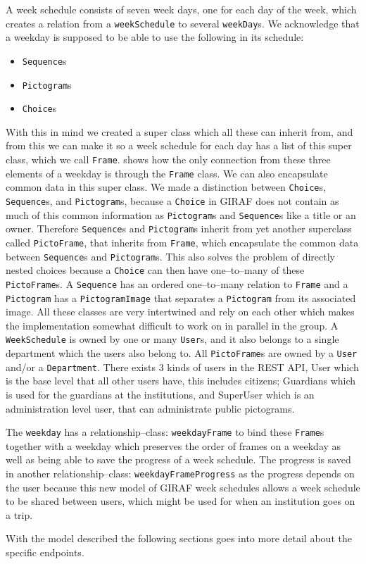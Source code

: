 A week schedule consists of seven week days, one for each day of the week, which creates a relation from a \texttt{weekSchedule} to several \texttt{weekDay}s.
We acknowledge that a weekday is supposed to be able to use the following in its schedule: 
\begin{multicols}{3}
\begin{itemize}
	\item \texttt{Sequence}s
	\item \texttt{Pictogram}s
	\item \texttt{Choice}s
\end{itemize}     
\end{multicols}

With this in mind we created a super class which all these can inherit from, and from this we can make it so a week schedule for each day has a list of this super class, which we call \texttt{Frame}.
 shows how the only connection from these three elements of a weekday is through the \texttt{Frame} class.
We can also encapsulate common data in this super class.
We made a distinction between \texttt{Choice}s, \texttt{Sequence}s, and \texttt{Pictogram}s, because a \texttt{Choice} in GIRAF does not contain as much of this common information as \texttt{Pictogram}s and \texttt{Sequence}s like a title or an owner.
Therefore \texttt{Sequence}s and \texttt{Pictogram}s inherit from yet another superclass called \texttt{PictoFrame}, that inherits from \texttt{Frame}, which encapsulate the common data between \texttt{Sequence}s and \texttt{Pictogram}s.
This also solves the problem of directly nested choices because a \texttt{Choice} can then have one--to--many of these \texttt{PictoFrame}s.
A \texttt{Sequence} has an ordered one--to--many relation to \texttt{Frame} and a \texttt{Pictogram} has a \texttt{PictogramImage} that separates a \texttt{Pictogram} from its associated image.
All these classes are very intertwined and rely on each other which makes the implementation somewhat difficult to work on in parallel in the group.
A \texttt{WeekSchedule} is owned by one or many \texttt{User}s, and it also belongs to a single department which the users also belong to.
All \texttt{PictoFrame}s are owned by a \texttt{User} and/or a \texttt{Department}.
There exists 3 kinds of users in the REST API, User which is the base level that all other users have, this includes citizens; Guardians which is used for the guardians at the institutions, and SuperUser which is an administration level user, that can administrate public pictograms.

The \texttt{weekday} has a relationship--class: \texttt{weekdayFrame} to bind these \texttt{Frame}s together with a weekday which preserves the order of frames on a weekday as well as being able to save the progress of a week schedule.
The progress is saved in another relationship--class: \texttt{weekdayFrameProgress} as the progress depends on the user because this new model of GIRAF week schedules allows a week schedule to be shared between users, which might be used for when an institution goes on a trip.

With the model described the following sections goes into more detail about the specific endpoints.
